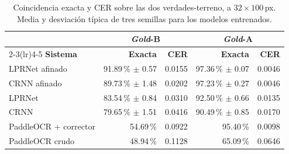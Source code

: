 \begin{table}[H]
\caption{Coincidencia exacta y CER sobre las dos verdades-terreno, a $32\times100$\,px.
Media y desviación típica de tres semillas para los modelos entrenados.\label{tab:reconocimiento}}
\begin{tabularx}{\textwidth}{Xrrrr}
\toprule
& \multicolumn{2}{c}{\textbf{\emph{Gold}-B}} & \multicolumn{2}{c}{\textbf{\emph{Gold}-A}} \\
\cmidrule(lr){2-3}\cmidrule(lr){4-5}
\textbf{Sistema} & \textbf{Exacta} & \textbf{CER} & \textbf{Exacta} & \textbf{CER} \\
\midrule
LPRNet afinado & 91.89\,\% $\pm$ 0.57 & 0.0155 & 97.36\,\% $\pm$ 0.07 & 0.0046 \\
CRNN afinado & 89.73\,\% $\pm$ 1.48 & 0.0202 & 97.23\,\% $\pm$ 0.27 & 0.0046 \\
LPRNet & 83.54\,\% $\pm$ 0.84 & 0.0310 & 92.50\,\% $\pm$ 0.66 & 0.0135 \\
CRNN & 79.65\,\% $\pm$ 1.51 & 0.0416 & 90.49\,\% $\pm$ 0.85 & 0.0170 \\
PaddleOCR + corrector & 54.69\,\% & 0.0922 & 95.40\,\% & 0.0098 \\
PaddleOCR crudo & 48.94\,\% & 0.1128 & 65.09\,\% & 0.0646 \\
\bottomrule
\end{tabularx}
\end{table}
